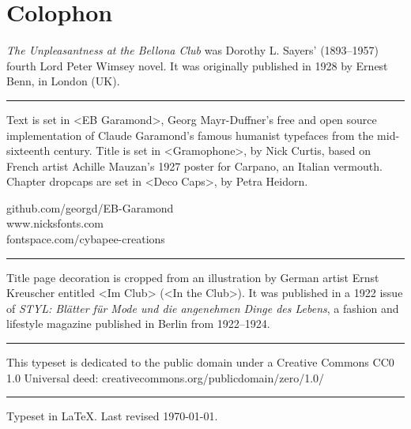 \documentclass[
paper=5.5in:8.5in,
]{scrbook} %
\begin{document}
\chapter*{Colophon}
\begin{center}
\begin{minipage}{\textwidth}
\textit{The Unpleasantness at the Bellona Club} was Dorothy L. Sayers' (1893--1957) fourth Lord Peter Wimsey novel. It was originally published in 1928 by Ernest Benn, in London (UK).
\end{minipage}
\vfill
\rule{0.5\textwidth}{.4pt}
\vfill
\begin{minipage}{\textwidth}
Text is set in <EB Garamond>, Georg Mayr-Duffner's free and open source implementation of Claude Garamond’s famous humanist typefaces from the mid-sixteenth century. Title is set in <Gramophone>, by Nick Curtis, based on French artist Achille Mauzan’s 1927 poster for Carpano, an Italian vermouth. Chapter dropcaps are set in <Deco Caps>, by Petra Heidorn.
\end{minipage}
\vfill
github.com/georgd/EB-Garamond\\www.nicksfonts.com\\fontspace.com/cybapee-creations
\vfill
\rule{0.5\textwidth}{.4pt}
\vfill
\begin{minipage}{\textwidth}
Title page decoration is cropped from an illustration by German artist Ernst Kreuscher entitled <Im Club> (<In the Club>). It was published in a 1922 issue of \textit{STYL: Blätter für Mode und die angenehmen Dinge des Lebens}, a fashion and lifestyle magazine published in Berlin from 1922--1924.
\end{minipage}
\vfill
\rule{0.5\textwidth}{.4pt}
\vfill
\begin{minipage}{\textwidth}
This typeset is dedicated to the public domain under a Creative Commons CC0 1.0 Universal deed: creativecommons.org/publicdomain/zero/1.0/
\end{minipage}
\vfill
\rule{0.5\textwidth}{.4pt}
\vfill
Typeset in \LaTeX{}. Last revised \today.
\end{center}
\thispagestyle{empty}
\end{document}
